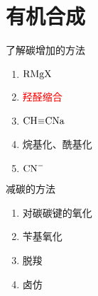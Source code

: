 \section{有机合成}

了解碳增加的方法

\begin{enumerate}
    \item \textcolor{red}{$\ce{RMgX}$}
    \item \textcolor{red}{羟醛缩合}
    \item $\ce{CH#CNa}$
    \item 烷基化、酰基化
    \item $\ce{CN-}$
\end{enumerate}

减碳的方法

\begin{enumerate}
    \item 对碳碳键的氧化
    \item 苄基氧化
    \item 脱羧
    \item 卤仿
\end{enumerate}